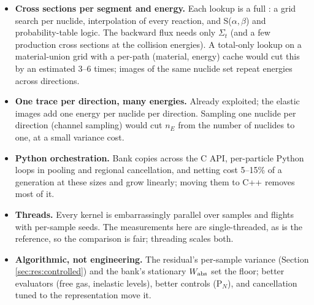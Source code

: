 \begin{itemize}
\item \textbf{Cross sections per segment and energy.} Each lookup is a full
  : a grid search per nuclide, interpolation of every reaction, and
  S($\alpha,\beta$) and probability-table logic. The backward flux needs only $\Sigma_t$ (and a few
  production cross sections at the collision energies). A total-only lookup on a material-union grid
  with a per-path (material, energy) cache would cut this by an estimated 3--6 times; images of the
  same nuclide set repeat energies across directions.
\item \textbf{One trace per direction, many energies.} Already exploited; the elastic images add one
  energy per nuclide per direction. Sampling one nuclide per direction (channel sampling) would cut
  $n_E$ from the number of nuclides to one, at a small variance cost.
\item \textbf{Python orchestration.} Bank copies across the C API, per-particle Python loops in
  pooling and regional cancellation, and  netting cost 5--15\% of a generation at these
  sizes and grow linearly; moving them to C++ removes most of it.
\item \textbf{Threads.} Every kernel is embarrassingly parallel over samples and flights with
  per-sample seeds. The measurements here are single-threaded, as is the reference, so the comparison
  is fair; threading scales both.
\item \textbf{Algorithmic, not engineering.} The residual's per-sample variance (Section
  \ref{sec:res:controlled}) and the bank's stationary $W_{\mathrm{abs}}$ set the floor; better evaluators (free gas,
  inelastic levels), better controls (P$_N$), and cancellation tuned to the representation move it.
\end{itemize}
